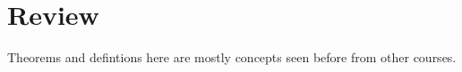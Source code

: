 \section*{Review}

Theorems and defintions here are mostly concepts seen before from other courses.


\clearpage


\clearpage



